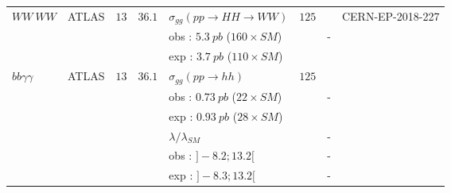 \begin{table}[h!]
\begin{center}
\begin{tabular}{|l|l|c|c|l|l|c|c|}
$WW\ WW$                &ATLAS            &$13$        &$36.1$        &$\sigma_{gg}(pp\rightarrow HH\rightarrow WW)$  &$125$                &    &CERN-EP-2018-227\\
                    &            &        &        &obs : $5.3\ pb$ ($160\times SM$) &                    &-    &\\
                    &            &        &        &exp : $3.7\ pb$ ($110\times SM$) &                    &    &\\
\hline
$bb \gamma\gamma$            &ATLAS            &$13$        &$36.1$        &$\sigma_{gg}(pp\rightarrow hh)$  &$125$                &    &\cite{Aaboud:2018ftw}\\
                    &            &        &        &obs : $0.73\ pb$ ($22\times SM$) &                    &-    &\\
                    &            &        &        &exp : $0.93\ pb$ ($28\times SM$) &                    &    &\\
                    &            &        &        &$\lambda/\lambda_{SM}$                &     &-    &\\
                    &            &        &        &obs : $]-8.2 ; 13.2[$            &     &-    &\\
                    &            &        &        &exp : $]-8.3 ; 13.2[$            &     &-    &\\
\cline{3-8}


\end{tabular}
\end{center}
\end{table}
